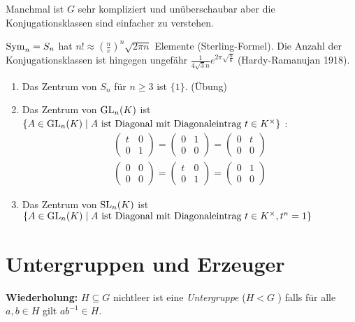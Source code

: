 Manchmal ist $G$ sehr kompliziert und unüberschaubar aber die Konjugationsklassen sind einfacher zu verstehen.

\begin{eg}
	$\operatorname{Sym}_{n} = S_{n}$ hat $n! \approx \left( \frac{n}{e} \right)^{n} \sqrt{2\pi n} $ Elemente (Sterling-Formel).
	Die Anzahl der Konjugationsklassen ist hingegen ungefähr $\frac{1}{4 \sqrt{3} n} e^{2\pi \sqrt{\frac{n}{6}}}$ (Hardy-Ramanujan 1918).
\end{eg}

\begin{eg}
	\begin{enumerate}[1)]
		\item Das Zentrum von $S_{n}$ für $n \geq 3$ ist $\{1\}$. (Übung)
		\item Das Zentrum von $\operatorname{GL}_{n}(K)$ ist $\{A \in \operatorname{GL}_{n}(K) \mid  A \text{ ist Diagonal mit Diagonaleintrag } t \in K^{\times}\}$ :
			\begin{align*}
			\begin{pmatrix} 
				t &0\\ 0 &1
			\end{pmatrix} = \begin{pmatrix} 
				0 &1\\ 0&0
			\end{pmatrix} = \begin{pmatrix} 
				0 &t\\ 0 & 0
			\end{pmatrix} \\
			\begin{pmatrix} 
				0 &0\\ 0 & 0
			\end{pmatrix} = \begin{pmatrix} 
				t &0\\ 0 &1
			\end{pmatrix} = \begin{pmatrix} 
				0 &1\\ 0 &0
			\end{pmatrix} 
			\end{align*}
		\item Das Zentrum von $\operatorname{SL}_{n}(K)$ ist $\{A \in \operatorname{GL}_{n}(K) \mid  A \text{ ist Diagonal mit Diagonaleintrag } t \in K^{\times}, t^{n} = 1\}$
	\end{enumerate}
\end{eg}

\section{Untergruppen und Erzeuger}
\textbf{Wiederholung:}
$H\subseteq G$ nichtleer ist eine \emph{Untergruppe} ($H<G$ ) falls für alle $a,b \in H$ gilt $ab^{-1} \in H$.


